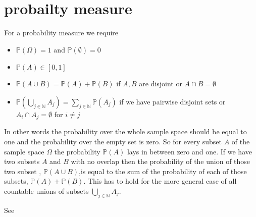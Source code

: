 \section{probailty measure}
For a probability measure we require
\begin{itemize}
	\item $\mathbb{P}(\Omega) = 1$ and $\mathbb{P}(\emptyset) = 0$
	\item $\mathbb{P}(A) \in [0,1]$
	\item $\mathbb{P}(A \cup B) =\mathbb{P}(A) + \mathbb{P}(B) $ if $A, B$ are disjoint or $A\cap B = \emptyset$
	\item $\mathbb{P}(\bigcup_{j \in \mathbb{N}} A_j )= \sum_{j \in \mathbb{N}}  \mathbb{P}(A_j)$ if we have pairwise disjoint sets or $A_i \cap A_j = \emptyset$ for $i \neq j $
\end{itemize}

In other words the probability over the whole sample space should be equal to one and the probability over the empty set is zero.
So for every subset $A$ of the sample space $\Omega$ the probability $\mathbb{P}(A)$ lays in between zero and one.
If we have two subsets $A$ and $B$ with no overlap then the probability of the union of those two subset , $\mathbb{P}(A \cup B)$,is equal to the sum of the probability of each of those subsets, $\mathbb{P}(A) + \mathbb{P}(B)$.
This has to hold for the more general case of all countable unions of subsets $\bigcup_{j \in \mathbb{N}} A_j$.

See \cite{lawler2016notes} \cite{kopp2004measintprob}